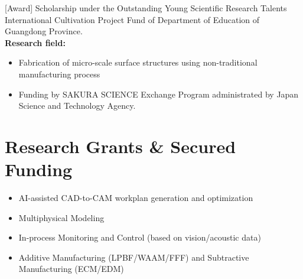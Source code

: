 \documentclass{resume}
\begin{document}
[Award] Scholarship under the Outstanding Young Scientific Research Talents International Cultivation Project Fund of Department of Education of Guangdong Province. \\
\vspace{1mm}
\textbf{Research field:}
\begin{itemize}[parsep=0.5ex]
  \item Fabrication of micro-scale surface structures using non-traditional manufacturing process\\
\end{itemize}

\begin{itemize}[parsep=0.5ex]
  \item Funding by SAKURA SCIENCE Exchange Program administrated by Japan Science and Technology Agency.
\end{itemize}



\vspace{5mm}
\section{Research Grants \& Secured Funding}
\begin{itemize}[parsep=0.5ex]
  \item AI-assisted CAD-to-CAM workplan generation and optimization
  \item Multiphysical Modeling
  \item In-process Monitoring and Control (based on vision/acoustic data)
  \item Additive Manufacturing (LPBF/WAAM/FFF) and Subtractive Manufacturing (ECM/EDM)
\end{itemize}
\end{document}
